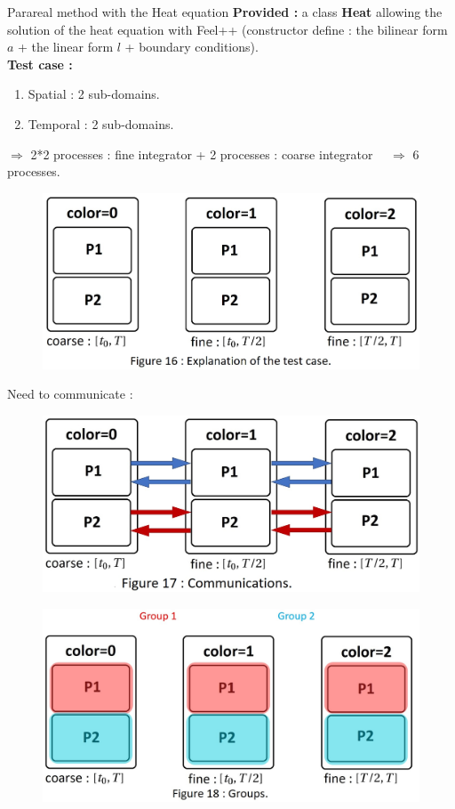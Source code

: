 \begin{frame}[allowframebreaks]{Parareal method with the Heat equation}
	\textbf{Provided :} a class \textbf{Heat} allowing the solution of the heat equation with Feel++ (constructor define : the bilinear form $a$ + the linear form $l$ + boundary conditions). \\
	
	\textbf{Test case :}
	\begin{enumerate}[\textbullet]
		\item Spatial : 2 sub-domains.
		\item Temporal : 2 sub-domains.
	\end{enumerate}
	$\Rightarrow$ 2*2 processes : fine integrator + 2 processes : coarse integrator $ \quad \Rightarrow$ 6 processes.
	\begin{figure}[H]
		\centering
		\includegraphics[width=0.5\linewidth]{"images/parareal/master_slave.jpg"}
	\end{figure}

	\newpage

	Need to communicate :
	\begin{figure}[H]
		\centering
		\includegraphics[width=0.45\linewidth]{"images/parareal/master_slave_comm.jpg"}
	\end{figure}
	\begin{figure}[H]
		\centering
		\includegraphics[width=0.45\linewidth]{"images/parareal/master_slave_group.jpg"}
	\end{figure}

	\newpage
	

\end{frame}
